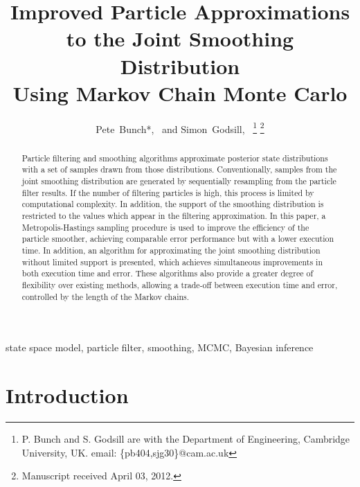 \documentclass[10pt,twocolumn,twoside]{IEEEtran}
\begin{document}
\title{Improved Particle Approximations \\ to the Joint Smoothing Distribution \\ Using Markov Chain Monte Carlo}

\author{Pete~Bunch*,~ and
        Simon~Godsill,~%
\thanks{P. Bunch and S. Godsill are with the Department
of Engineering, Cambridge University, UK. email: \{pb404,sjg30\}@cam.ac.uk}%
\thanks{Manuscript received April 03, 2012.}}


\maketitle


\begin{abstract}
Particle filtering and smoothing algorithms approximate posterior state distributions with a set of samples drawn from those distributions. Conventionally, samples from the joint smoothing distribution are generated by sequentially resampling from the particle filter results. If the number of filtering particles is high, this process is limited by computational complexity. In addition, the support of the smoothing distribution is restricted to the values which appear in the filtering approximation. In this paper, a Metropolis-Hastings sampling procedure is used to improve the efficiency of the particle smoother, achieving comparable error performance but with a lower execution time. In addition, an algorithm for approximating the joint smoothing distribution without limited support is presented, which achieves simultaneous improvements in both execution time and error. These algorithms also provide a greater degree of flexibility over existing methods, allowing a trade-off between execution time and error, controlled by the length of the Markov chains.
\end{abstract}



\begin{IEEEkeywords}
state space model, particle filter, smoothing, MCMC, Bayesian inference
\end{IEEEkeywords}



\section{Introduction} \label{sec:intro}
\end{document}
